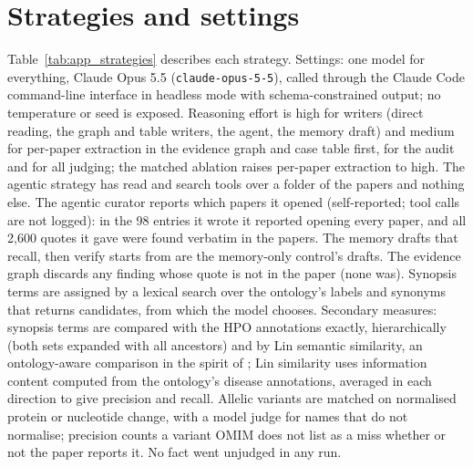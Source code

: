 \documentclass{article} %
\begin{document}
\section{Strategies and settings}
\label{app:settings}
Table~\ref{tab:app_strategies} describes each strategy. Settings: one model for everything, Claude Opus 5.5 (\texttt{claude-opus-5-5}), called through the Claude Code command-line interface in headless mode with schema-constrained output; no temperature or seed is exposed. Reasoning effort is high for writers (direct reading, the graph and table writers, the agent, the memory draft) and medium for per-paper extraction in the evidence graph and case table first, for the audit and for all judging; the matched ablation raises per-paper extraction to high. The agentic strategy has read and search tools over a folder of the papers and nothing else. The agentic curator reports which papers it opened (self-reported; tool calls are not logged): in the 98 entries it wrote it reported opening every paper, and all 2,600 quotes it gave were found verbatim in the papers. The memory drafts that recall, then verify starts from are the memory-only control's drafts. The evidence graph discards any finding whose quote is not in the paper (none was). Synopsis terms are assigned by a lexical search over the ontology's labels and synonyms that returns candidates, from which the model chooses. Secondary measures: synopsis terms are compared with the HPO annotations exactly, hierarchically (both sets expanded with all ancestors) and by Lin semantic similarity, an ontology-aware comparison in the spirit of \citet{Khler2009ClinicalDiagnostics}; Lin similarity uses information content computed from the ontology's disease annotations, averaged in each direction to give precision and recall. Allelic variants are matched on normalised protein or nucleotide change, with a model judge for names that do not normalise; precision counts a variant OMIM does not list as a miss whether or not the paper reports it. No fact went unjudged in any run.
\end{document}
